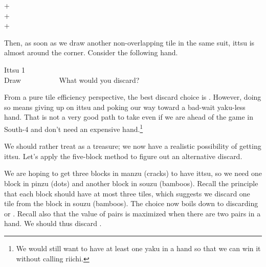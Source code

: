 \bigskip
{\begin{center}
{\Huge {}+}  \\ [\sep]
{\Huge {}+} \\ [\sep]
{\Huge {}+} 
\end{center}}

\bigskip
Then, as soon as we draw another non-overlapping tile in the same suit,  {\jap ittsu} is almost around the corner. 
Consider the following hand. 

\bigskip
\begin{itembox}[r]{{\jap Ittsu} 1}
\bp
{}~\\
\hfill\footnotesize{Draw~~~~~~~~~~}
\ep
\vspace{-17pt}What would you discard? \vspace{-5pt}
\end{itembox}

\bigskip
From a pure tile efficiency perspective, the best discard choice is {\LARGE{}}.
However, doing so means giving up on {\jap ittsu} and poking our way toward a bad-wait {\jap yaku}-less hand. That is not a very good path to take even if we are ahead of the game in South-4 and don't need an expensive hand.\footnote{We would still want to have at least one {\jap yaku} in a hand so that we can win it without calling riichi.}

\bigskip
We should rather treat {\LARGE{}} as a treasure; we now have a realistic possibility of getting {\jap ittsu}. Let's apply the five-block method to figure out an alternative discard.
\bigskip
{}\emj

\bigskip
We are hoping to get three blocks in {\jap manzu} (cracks) to have {\jap ittsu}, so we need one block in {\jap pinzu} (dots) and another block in {\jap souzu} (bamboos). Recall the principle that each block should have at most three tiles, which suggests we discard one tile from the block in {\jap souzu} (bamboos). The choice now boils down to discarding {\LARGE{}} or {\LARGE{}}. Recall also that the value of pairs is maximized when there are two pairs in a hand. We should thus discard {\LARGE{}}. 

